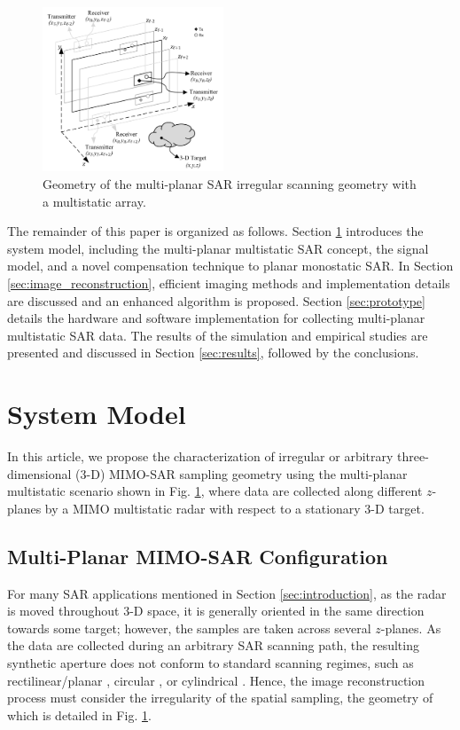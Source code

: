 \documentclass{ieeeaccess}
\begin{document}
\begin{figure}[h]
    \centering
    \includegraphics[width=0.48\textwidth]{smith1.png}
    \caption{Geometry of the multi-planar SAR irregular scanning geometry with a multistatic array.}
    \label{fig:multiplanar}
\end{figure}

The remainder of this paper is organized as follows.
Section \ref{sec:system_model} introduces the system model, including the multi-planar multistatic SAR concept, the signal model, and a novel compensation technique to planar monostatic SAR. 
In Section \ref{sec:image_reconstruction}, efficient imaging methods and implementation details are discussed and an enhanced algorithm is proposed.
Section \ref{sec:prototype} details the hardware and software implementation for collecting multi-planar multistatic SAR data.
The results of the simulation and empirical studies are presented and discussed in Section \ref{sec:results}, followed by the conclusions.

\section{System Model}
\label{sec:system_model}
In this article, we propose the characterization of irregular or arbitrary three-dimensional (\mbox{3-D}) MIMO-SAR sampling geometry using the multi-planar multistatic scenario shown in Fig. \ref{fig:multiplanar}, where data are collected along different $z$-planes by a MIMO multistatic radar with respect to a stationary \mbox{3-D} target.

\subsection{Multi-Planar MIMO-SAR Configuration}
\label{subsec:multiplanar_SAR}
For many SAR applications mentioned in Section \ref{sec:introduction}, as the radar is moved throughout \mbox{3-D} space, it is generally oriented in the same direction towards some target; however, the samples are taken across several $z$-planes. 
As the data are collected during an arbitrary SAR scanning path, the resulting synthetic aperture does not conform to standard scanning regimes, such as rectilinear/planar \cite{sheen2016three,yanik2020development}, circular \cite{wu2020multilayered,gao2016efficient}, or cylindrical \cite{amineh2019real,smith2020nearfieldisar,smith2022ThzToolbox}.
Hence, the image reconstruction process must consider the irregularity of the spatial sampling, the geometry of which is detailed in Fig. \ref{fig:multiplanar}.
\end{document}
